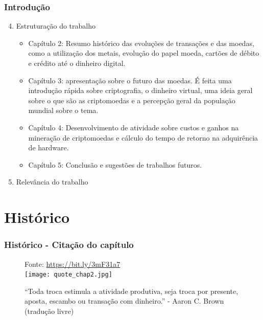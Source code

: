 \documentclass[aspectratio=43,8pt]{beamer}%
\begin{document}
	\begin{frame}
		\frametitle{Introdução}
			\begin{keypoint}
			\begin{enumerate}
				 \setcounter{enumi}{3}
		\item Estruturação do trabalho 
\pause 
		\begin{itemize}
			\item Capítulo 2: Resumo histórico das evoluções de transações e das moedas, como a utilização dos metais, evolução do papel moeda, cartões de débito e crédito até o dinheiro digital. 
			\item Capítulo 3: apresentação sobre o futuro das moedas. É feita uma introdução rápida sobre criptografia, o dinheiro virtual, uma ideia geral sobre o que são as criptomoedas e a percepção geral da população mundial sobre o tema. 
			\item Capítulo 4: Desenvolvimento de atividade sobre custos e ganhos na mineração de criptomoedas e cálculo do tempo de retorno na adquirência de hardware.
			\item Capítulo 5: Conclusão e sugestões de trabalhos futuros. 
		\end{itemize}
\pause
	\item Relevância do trabalho
		
		
	\end{enumerate}
	\end{keypoint}
\end{frame}


\section{Histórico}

\begin{frame}
	\frametitle{Histórico - Citação do capítulo}
	
	\begin{figure}
		\centering
		{\footnotesize Fonte:  \url{https://bit.ly/3mF31a7}}\\
		\texttt{[image: quote\_chap2.jpg]}
		\caption{
			``Toda troca estimula a atividade produtiva,
			seja troca por presente, aposta, escambo ou
			transação com dinheiro.'' - Aaron C. Brown
			(tradução livre)
}
	\end{figure}
\end{frame}
\end{document}
